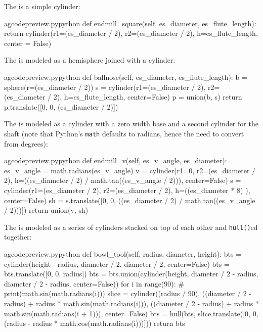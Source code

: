 \documentclass{ltxdoc}
\begin{document}
The  is a simple cylinder:

\lstset{firstnumber=\thegcpy}
\begin{writecode}{a}{gcodepreview.py}{python}
    def endmill_square(self, es_diameter, es_flute_length):
        return cylinder(r1=(es_diameter / 2), r2=(es_diameter / 2), h=es_flute_length, center = False)

\end{writecode}
\addtocounter{gcpy}{3}

The  is modeled as a hemisphere joined with a cylinder:

\lstset{firstnumber=\thegcpy}
\begin{writecode}{a}{gcodepreview.py}{python}
    def ballnose(self, es_diameter, es_flute_length):
        b = sphere(r=(es_diameter / 2))
        s = cylinder(r1=(es_diameter / 2), r2=(es_diameter / 2), h=es_flute_length, center=False)
        p = union(b, s)
        return p.translate([0, 0, (es_diameter / 2)])

\end{writecode}
\addtocounter{gcpy}{6}

The  is modeled as a cylinder with a zero width base and a second cylinder for the shaft (note that Python's \verb|math| defaults to radians, hence the need to convert from degrees):

\lstset{firstnumber=\thegcpy}
\begin{writecode}{a}{gcodepreview.py}{python}
    def endmill_v(self, es_v_angle, es_diameter):
        es_v_angle = math.radians(es_v_angle)
        v = cylinder(r1=0, r2=(es_diameter / 2), h=((es_diameter / 2) / math.tan((es_v_angle / 2))), center=False)
        s = cylinder(r1=(es_diameter / 2), r2=(es_diameter / 2), h=((es_diameter * 8) ), center=False)
        sh = s.translate([0, 0, ((es_diameter / 2) / math.tan((es_v_angle / 2)))])
        return union(v, sh)

\end{writecode}
\addtocounter{gcpy}{7}

The  is modeled as a series of cylinders stacked on top of each other and \verb|hull()|ed together:

\lstset{firstnumber=\thegcpy}
\begin{writecode}{a}{gcodepreview.py}{python}
    def bowl_tool(self, radius, diameter, height):
        bts = cylinder(height - radius, diameter / 2, diameter / 2, center=False)
        bts = bts.translate([0, 0, radius])
        bts = bts.union(cylinder(height, diameter / 2 - radius, diameter / 2 - radius, center=False))
        for i in range(90):
#            print(math.sin(math.radians(i)))
            slice = cylinder((radius / 90), ((diameter / 2 - radius) + radius * math.sin(math.radians(i))), ((diameter / 2 - radius) + radius * math.sin(math.radians(i + 1))), center=False)
            bts = hull(bts, slice.translate([0, 0, (radius - radius * math.cos(math.radians(i)))]))
        return bts

\end{writecode}
\addtocounter{gcpy}{10}
\end{document}
